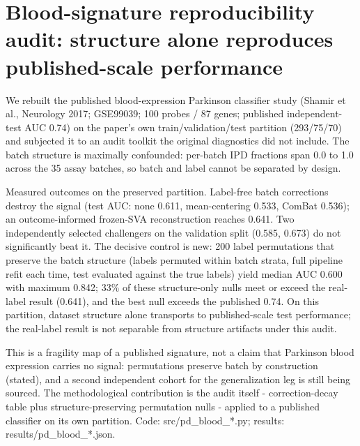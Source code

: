 \section{Blood-signature reproducibility audit: structure alone reproduces published-scale performance}
We rebuilt the published blood-expression Parkinson classifier study (Shamir et
al., Neurology 2017; GSE99039; 100 probes / 87 genes; published independent-test
AUC 0.74) on the paper's own train/validation/test partition (293/75/70) and
subjected it to an audit toolkit the original diagnostics did not include. The
batch structure is maximally confounded: per-batch IPD fractions span 0.0 to 1.0
across the 35 assay batches, so batch and label cannot be separated by design.

Measured outcomes on the preserved partition. Label-free batch corrections
destroy the signal (test AUC: none 0.611, mean-centering 0.533, ComBat 0.536);
an outcome-informed frozen-SVA reconstruction reaches 0.641. Two independently
selected challengers on the validation split (0.585, 0.673) do not significantly
beat it. The decisive control is new: 200 label permutations that preserve the
batch structure (labels permuted within batch strata, full pipeline refit each
time, test evaluated against the true labels) yield median AUC 0.600 with
maximum 0.842; 33\% of these structure-only nulls meet or exceed the real-label
result (0.641), and the best null exceeds the published 0.74. On this partition,
dataset structure alone transports to published-scale test performance; the
real-label result is not separable from structure artifacts under this audit.

This is a fragility map of a published signature, not a claim that Parkinson
blood expression carries no signal: permutations preserve batch by construction
(stated), and a second independent cohort for the generalization leg is still
being sourced. The methodological contribution is the audit itself -
correction-decay table plus structure-preserving permutation nulls - applied to
a published classifier on its own partition. Code: src/pd\_blood\_*.py;
results: results/pd\_blood\_*.json.

